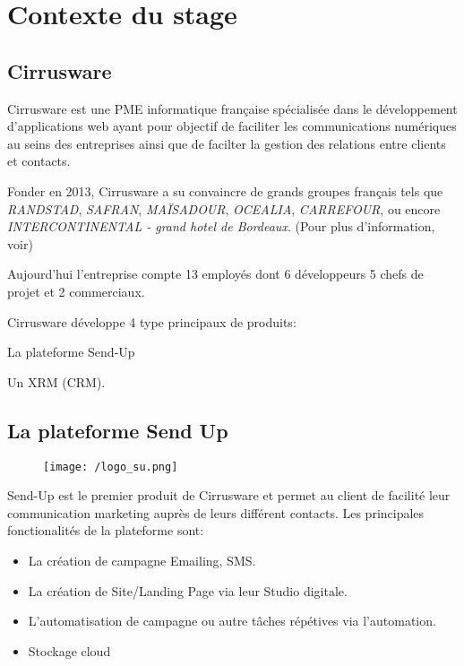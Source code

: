 \section{Contexte du stage}
\subsection{Cirrusware}
Cirrusware est une PME informatique française spécialisée dans le développement d'applications web ayant pour objectif de faciliter les communications numériques au seins des entreprises ainsi que de facilter la gestion des relations entre clients et contacts. 

Fonder en 2013, Cirrusware a su convaincre de grands groupes français tels que \textit{RANDSTAD}, \textit{SAFRAN}, \textit{MAÏSADOUR}, \textit{OCEALIA}, \textit{CARREFOUR}, ou encore \textit{INTERCONTINENTAL - grand hotel de Bordeaux}. (Pour plus d'information, voir)


Aujourd'hui l'entreprise compte 13 employés dont 6 développeurs 5 chefs de projet et 2 commerciaux. 


Cirrusware développe 4 type principaux de produits: 
\begin{list}{}{}
    \item La plateforme Send-Up\cite{sendup}
    \item Un XRM (CRM).
\end{list}

\subsection{La plateforme Send Up}
\begin{figure}[!h]
\centering
    \texttt{[image: /logo\_su.png]}

\end{figure}
Send-Up est le premier produit de Cirrusware et permet au client de facilité leur communication marketing auprès de leurs différent contacts.
Les principales fonctionalités de la plateforme sont:
\begin{itemize}
    \item La création de campagne Emailing, SMS. 
    \item La création de Site/Landing Page via leur Studio digitale.
    \item L'automatisation de campagne ou autre tâches répétives via l'automation.
    \item Stockage cloud 
\end{itemize}


